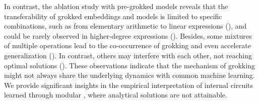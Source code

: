 \documentclass[10pt]{article} %
\newcommand{\update}[1]{{\color{black}{#1}}}
\begin{document}
% 

In contrast, the ablation study with pre-grokked models reveals that the transferability of grokked embeddings and models is limited to specific combinations, such as from elementary arithmetic to linear expressions (), and could be rarely observed in higher-degree expressions ().
Besides, some mixtures of multiple operations lead to the co-occurrence of grokking and even accelerate generalization (). In contrast, others may interfere with each other, not reaching optimal solutions ().
These observations indicate that the mechanism of grokking might not always share the underlying dynamics with common machine learning.
We provide significant insights in the empirical interpretation of internal circuits learned through modular \update{operations}, where analytical solutions are not attainable.
\end{document}
